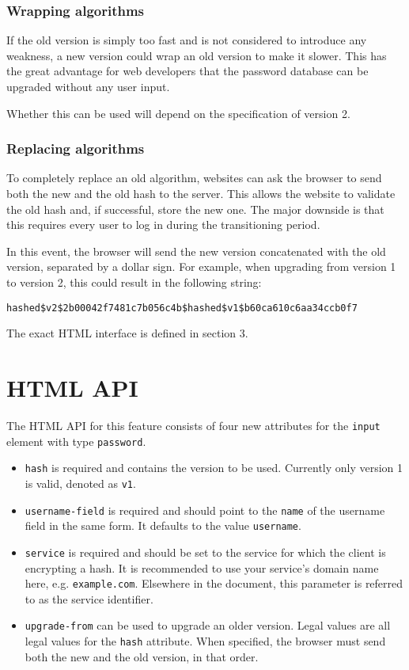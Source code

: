 \documentclass{paper}
\newcommand{\code}[1]{\texttt{\colorbox{gray!11}{#1}}}
\begin{document}
\subsubsection{Wrapping algorithms}

If the old version is simply too fast and is not considered to introduce any weakness, a new
version could wrap an old version to make it slower. This has the great advantage for web
developers that the password database can be upgraded without any user input.

Whether this can be used will depend on the specification of version 2.

\subsubsection{Replacing algorithms}

To completely replace an old algorithm, websites can ask the browser to send both the new and
the old hash to the server. This allows the website to validate the old hash and, if
successful, store the new one. The major downside is that this requires every user to log in
during the transitioning period.

In this event, the browser will send the new version concatenated with the old version,
separated by a dollar sign. For example, when upgrading from version 1 to version 2, this
could result in the following string:

\code{hashed\$v2\$2b00042f7481c7b056c4b\$hashed\$v1\$b60ca610c6aa34ccb0f7}

The exact HTML interface is defined in section 3.

\section{HTML API}

The HTML API for this feature consists of four new attributes for the \code{input} element
with type \code{password}.

\begin{itemize}
\item \code{hash} is required and contains the version to be used. Currently only version 1
is valid, denoted as \code{v1}.
\item \code{username-field} is required and should point to the \code{name} of the username
field in the same form. It defaults to the value \code{username}.
\item \code{service} is required and should be set to the service for which the client is
encrypting a hash. It is recommended to use your service's domain name here, e.g.
\code{example.com}. Elsewhere in the document, this parameter is referred to as the service
identifier.
\item \code{upgrade-from} can be used to upgrade an older version. Legal values are all legal
values for the \code{hash} attribute. When specified, the browser must send both the new and
the old version, in that order.
\end{itemize}
\end{document}
